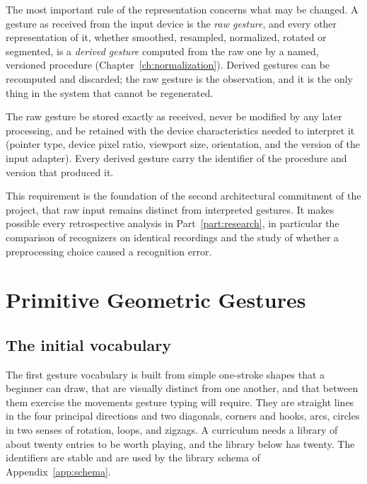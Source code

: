 The most important rule of the representation concerns what may be changed. A gesture as received from the input device is the \emph{raw gesture}, and every other representation of it, whether smoothed, resampled, normalized, rotated or segmented, is a \emph{derived gesture} computed from the raw one by a named, versioned procedure (Chapter~\ref{ch:normalization}). Derived gestures can be recomputed and discarded; the raw gesture is the observation, and it is the only thing in the system that cannot be regenerated.

\begin{requirement}\label{req:raw}
The raw gesture \must{} be stored exactly as received, \must{} never be modified by any later processing, and \must{} be retained with the device characteristics needed to interpret it (pointer type, device pixel ratio, viewport size, orientation, and the version of the input adapter). Every derived gesture \must{} carry the identifier of the procedure and version that produced it.\evS
\end{requirement}

This requirement is the foundation of the second architectural commitment of the project, that raw input remains distinct from interpreted gestures. It makes possible every retrospective analysis in Part~\ref{part:research}, in particular the comparison of recognizers on identical recordings and the study of whether a preprocessing choice caused a recognition error.

\chapter{Primitive Geometric Gestures}\label{ch:primitives}

\section{The initial vocabulary}

The first gesture vocabulary is built from simple one-stroke shapes that a beginner can draw, that are visually distinct from one another, and that between them exercise the movements gesture typing will require. They are straight lines in the four principal directions and two diagonals, corners and hooks, arcs, circles in two senses of rotation, loops, and zigzags. A curriculum needs a library of about twenty entries to be worth playing, and the library below has twenty. The identifiers are stable and are used by the library schema of Appendix~\ref{app:schema}.

